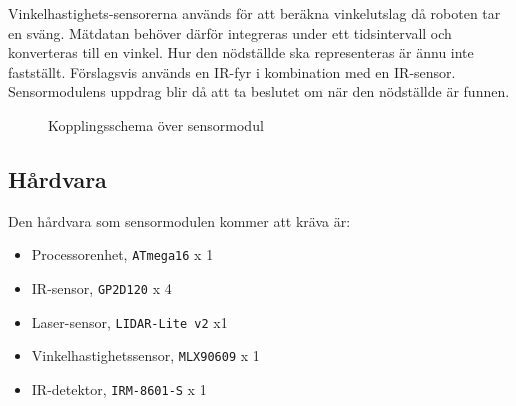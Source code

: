 \documentclass[11pt]{article}
\begin{document}
\begin{flushleft}
Vinkelhastighets-sensorerna används för att beräkna vinkelutslag då roboten tar en sväng. Mätdatan behöver därför integreras under ett tidsintervall och konverteras till en vinkel. Hur den nödställde ska representeras är ännu inte fastställt. Förslagsvis används en IR-fyr i kombination med en IR-sensor. Sensormodulens uppdrag blir då att ta beslutet om när den nödställde är funnen.

\begin{figure}[htbp]
\centering
\noindent{}
	\caption{Kopplingsschema över sensormodul \label{kopplingsschema:sensormodul}}	
\end{figure}
 
\subsection{Hårdvara}
Den hårdvara som sensormodulen kommer att kräva är:

\begin{itemize}
\item{Processorenhet, \verb+ATmega16+ x 1}
\item{IR-sensor, \verb+GP2D120+ x 4}
\item{Laser-sensor, \verb+LIDAR-Lite v2+ x1}
\item{Vinkelhastighetssensor, \verb+MLX90609+ x 1}
\item{IR-detektor, \verb+IRM-8601-S+ x 1}


\end{itemize}
\end{flushleft}
\end{document}
